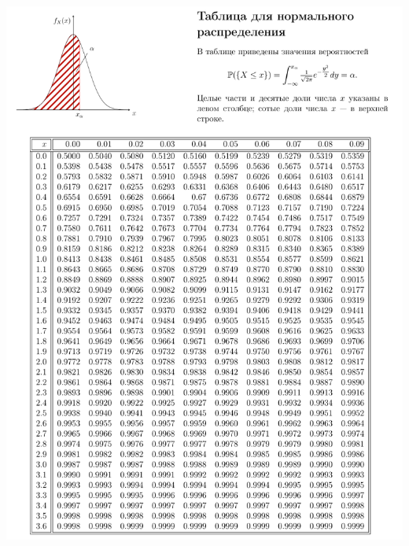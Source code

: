 \documentclass[12pt]{article}
\begin{document}
\begin{enumerate}
\includegraphics[scale=0.50]{normal_table.png}

\end{enumerate}
\end{document}

